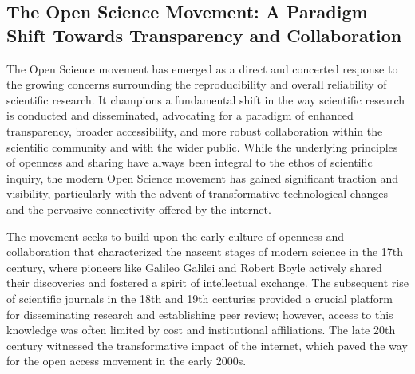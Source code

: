 \documentclass{article}
\begin{document}
\subsection{The Open Science Movement: A Paradigm Shift Towards Transparency and Collaboration}

The Open Science movement has emerged as a direct and concerted response to the growing concerns surrounding the reproducibility and overall reliability of scientific research. It champions a fundamental shift in the way scientific research is conducted and disseminated, advocating for a paradigm of enhanced transparency, broader accessibility, and more robust collaboration within the scientific community and with the wider public. While the underlying principles of openness and sharing have always been integral to the ethos of scientific inquiry, the modern Open Science movement has gained significant traction and visibility, particularly with the advent of transformative technological changes and the pervasive connectivity offered by the internet.

The movement seeks to build upon the early culture of openness and collaboration that characterized the nascent stages of modern science in the 17th century, where pioneers like Galileo Galilei and Robert Boyle actively shared their discoveries and fostered a spirit of intellectual exchange. The subsequent rise of scientific journals in the 18th and 19th centuries provided a crucial platform for disseminating research and establishing peer review; however, access to this knowledge was often limited by cost and institutional affiliations. The late 20th century witnessed the transformative impact of the internet, which paved the way for the open access movement in the early 2000s.
\end{document}
